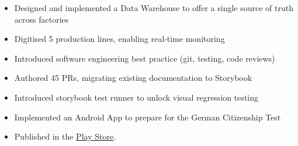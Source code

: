 \documentclass[10pt,a4paper,ragged2e,withhyper]{altacv}
\begin{document}
\begin{paracol}{2}
\divider

\begin{itemize}
\item Designed and implemented a Data Warehouse to offer a single source of truth across factories
\item Digitised 5 production lines, enabling real-time monitoring
\item Introduced software engineering best practice (git, testing, code reviews)
\end{itemize}




\begin{itemize}
  \item Authored 45 PRs, migrating existing documentation to Storybook
  \item Introduced storybook test runner to unlock visual regression testing
\end{itemize}

\medskip


\begin{itemize}
  \item Implemented an Android App to prepare for the German Citizenship Test
  \item Published in the \href{https://play.google.com/store/apps/details?id=com.nrieble.quizapp}{Play Store}.
\end{itemize}




\medskip




\end{paracol}
\end{document}
